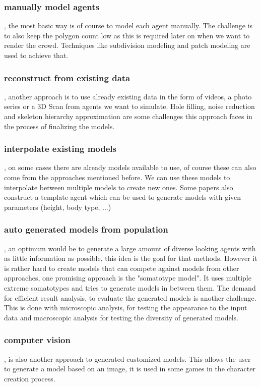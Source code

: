 \documentclass{acmsiggraph}               %
\begin{document}
\subsubsection{manually model agents}, the most basic way is of course to model each agent manually. The challenge is to also keep the polygon count low as this is required later on when we want to render the crowd. Techniques like subdivision modeling and patch modeling are used to achieve that.
\subsubsection{reconstruct from existing data}, another approach is to use already existing data in the form of videos, a photo series or a 3D Scan from agents we want to simulate. Hole filling, noise reduction and skeleton hierarchy approximation are some challenges this approach faces in the process of finalizing the models. 
\subsubsection{interpolate existing models}, on some cases there are already models available to use, of course these can also come from the approaches mentioned before. We can use these models to interpolate between multiple models to create new ones. Some papers also construct a template agent which can be used to generate models with given parameters (height, body type, ...)
\subsubsection{auto generated models from population}, an optimum would be to generate a large amount of diverse looking agents with as little information as possible, this idea is the goal for that methods. However it is rather hard to create models that can compete against models from other approaches, one promising approach is the "somatotype model". It uses multiple extreme somatotypes and tries to generate models in between them. The demand for efficient result analysis, to evaluate the generated models is another challenge. This is done with microscopic analysis, for testing the appearance to the input data and macroscopic analysis for testing the diversity of generated models. 
\subsubsection{computer vision}, is also another approach to generated customized models. This allows the user to generate a model based on an image, it is used in some games in the character creation process. 
\end{document}
